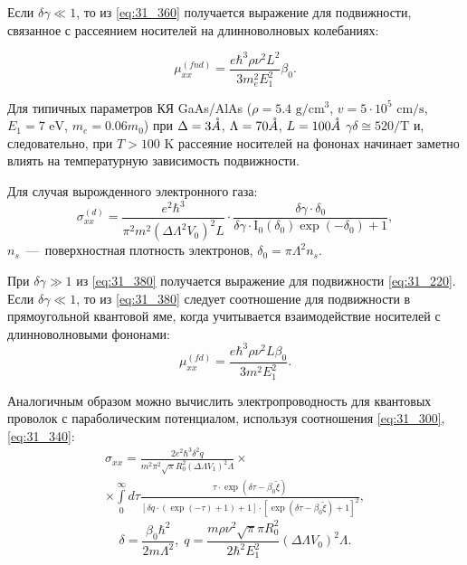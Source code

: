 Если $\delta \gamma \ll 1$, то из \eqref{eq:31_360} получается выражение для подвижности, связанное с рассеянием носителей на длинноволновых колебаниях:

\begin{equation} \label{eq:31_370}
\mu _{xx}^{(fnd)} =\frac{e\hbar^3 \rho \nu^2 L^2 }{3m_e^{2} E_1^2 } \beta_0. 
\end{equation}

Для типичных параметров КЯ GaAs/AlAs ($\rho =5.4 \text{ g} / \text{cm}^3 $, $v=5\cdot 10^5 \text{ cm/s}$, $E_1 =7 \text{ eV}$, $m_e=0.06m_0 $) при $\Delta =3 \AA$, $\Lambda =70 \AA$, $L = 100 \AA$  $\gamma \delta \cong 520/\text{T}$ и, следовательно, при $T>100\text{ K}$ рассеяние носителей на фононах начинает заметно влиять на температурную зависимость подвижности.

Для случая вырожденного электронного газа:
\begin{equation} \label{eq:31_380}
\sigma _{xx}^{(d)} =\frac{e^2 \hbar^3 }{\pi^2 m^2 \left(\Delta \Lambda^2 V_0 \right)^2 L} \cdot 
\frac{\delta \gamma \cdot \delta_0 }{\delta \gamma \cdot \mathrm{I}_0 \left(\delta_0 \right)\exp\left(-\delta_0 \right)+1} ,
\end{equation}
$n_s $~---~поверхностная плотность электронов, $\delta_0 =\pi \Lambda^2 n_s $.

При $\delta \gamma \gg 1$ из \eqref{eq:31_380} получается выражение для подвижности \eqref{eq:31_220}. Если $\delta \gamma \ll 1$, то из \eqref{eq:31_380} следует соотношение для подвижности в прямоугольной квантовой яме, когда учитывается взаимодействие носителей с длинноволновыми фононами:
\begin{equation} \label{eq:31_390}
\mu _{xx}^{(fd)} =\frac{e\hbar^3 \rho \nu^2 L\beta_0 }{3 m^2 E_1^2 }. 
\end{equation}
 
Аналогичным образом можно вычислить электропроводность для квантовых проволок с параболическим потенциалом, используя соотношения \eqref{eq:31_300}, \eqref{eq:31_340}:
\begin{multline} \label{eq:31_400}
\sigma _{xx} =\frac{2e^2 \hbar^3 \delta^2 q}{m^2 \pi^2 \sqrt{\pi } R_0^2 \left(\Delta \Lambda V_1 \right)^2 \Lambda } \times\\
\times\int\limits_0^{\infty} {d\tau \frac{\tau \cdot {\exp}\left(\delta \tau -\beta _{0} \tilde{\xi }\right)}{\left[\delta q\cdot \left(\exp(-\tau) +1 \right)+1\right]\cdot \left[{\exp}\left(\delta \tau -\beta _{0} \tilde{\xi }\right)+1\right]^{2} }}, 
\end{multline}
\[
\delta =\frac{\beta_0 \hbar^2 }{2m\Lambda^2 }, \;
q=\frac{m \rho \nu^2 \sqrt{\pi } \pi R_0^2 }{2\hbar^2 E_1^2 } \left(\Delta \Lambda V_0 \right)^2 \Lambda .
\] 

